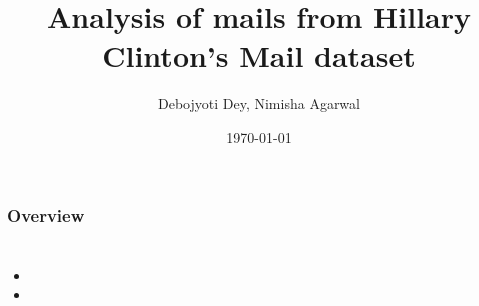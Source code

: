 \documentclass{beamer}
\title[Short title]{Analysis of mails from Hillary Clinton’s Mail dataset} %
\author{Debojyoti Dey, Nimisha Agarwal} %
\date{\today} %
\begin{document}
	
\begin{frame}
	\titlepage %
\end{frame}

\begin{frame}
	\frametitle{Overview} %
	\tableofcontents %
\end{frame}


\section{}

\begin{frame}
	\frametitle{}
	\begin{itemize}
		\item 
		\item 
	\end{itemize}
\end{frame}


\begin{frame}
	\frametitle{}
	
\end{frame}


\begin{frame}
	\frametitle{}
	
\end{frame}


\begin{frame}
	\frametitle{}
	
\end{frame}
\end{document}
